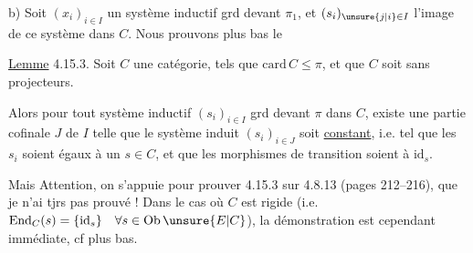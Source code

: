 
b) Soit $(x_i)_{i\in I}$ un système inductif grd devant $\pi_1$, et $(s_i)_{\unsure{j|i}\in I}$ l'image de ce système dans $C$.  Nous prouvons plus bas le

\uline{Lemme} 4.15.3. Soit $C$ une catégorie,  tels que $\mathrm{card}\,C\leq\pi$, et que $C$ soit sans projecteurs.

Alors pour tout système inductif $(s_i)_{i\in I}$ grd devant $\pi$ dans $C$, existe une partie cofinale  $J$ de $I$ telle que  le système induit $(s_i)_{i\in J}$ soit \uline{constant}, i.e. tel que les $s_i$ soient égaux à un $s\in C$, et que les morphismes de transition soient    à $\mathrm{id}_s$.

\margin{Sous \unsure{réserve|réserves} de la validité du \unsure{corollaire|coroll.} de 4.8.13. Mais c'est à présent établi, sous une \unsure{forme|hyp.} \unsure{suffisante|plus suffisante|moins restrictive}, \unsure{cf.} \unsure{4.15.6 a) 1°]|4.15.6 a) 1°|4.15.6 a)}}

Mais Attention, on s'appuie pour prouver 4.15.3 sur  4.8.13 (pages 212--216), que je n'ai tjrs pas prouvé ! Dans le cas où $C$ est rigide (i.e. $\mathrm{End}_C(s)=\{\mathrm{id}_s\}\quad\forall s\in\mathrm{Ob}\,\unsure{E|C}$), la démonstration est cependant immédiate, cf plus bas.

